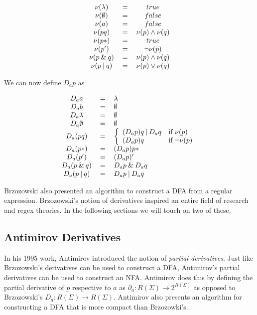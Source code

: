 \[
\begin{tabular}{c c c}
    $\nu(\lambda)$ & $=$ & $true$ \\
    $\nu(\emptyset)$ & $=$ & $false$ \\
    $\nu(a)$ & $=$ & $false$ \\
    $\nu(pq)$ & $=$ & $\nu(p) \land \nu(q)$ \\
    $\nu(p*)$ & $=$ & $true$ \\
    $\nu(p')$ & $=$ & $\neg \nu(p)$ \\
    $\nu(p\:\&\:q)$ & $=$ & $\nu(p) \land \nu(q)$ \\
    $\nu(p\:|\:q)$ & $=$ & $\nu(p) \lor \nu(q)$ \\
\end{tabular}
\]

We can now define $D_ap$ as

\[
\begin{tabular}{c c l}
    $D_aa$ & $=$ & $\lambda$ \\
    $D_ab$ & $=$ & $\emptyset$ \\
    $D_a\lambda$ & $=$ & $\emptyset$ \\
    $D_a\emptyset$ & $=$ & $\emptyset$ \\

    $D_a(pq)$ & $=$ & $
    \left\{
	\begin{array}{ll}
		(D_ap)q\:|\:D_aq  & \mbox{if } \nu(p) \\
		(D_ap)q & \mbox{if } \neg \nu(p)
	\end{array}
    \right.
    $ \\
    
    $D_a(p*)$ & $=$ & $(D_ap)p*$ \\
    $D_a(p')$ & $=$ & $(D_ap)'$ \\
    $D_a(p\:\&\:q)$ & $=$ & $D_ap\:\&\:D_aq$ \\
    $D_a(p\:|\:q)$ & $=$ & $D_ap\:|\:D_aq$ \\
\end{tabular}
\]

Brzozowski also presented an algorithm to construct a DFA from a regular expression.
Brzozowski's notion of derivatives inspired an entire field of research and regex theories. In the following sections we will touch on two of these.

\subsection{Antimirov Derivatives}
In his 1995 work, Antimirov \cite{antimirov} introduced the notion of \textit{partial derivatives}. Just like Brzozowski's derivatives can be used to construct a DFA, Antimirov's partial derivatives can be used to construct an NFA. Antimirov does this by defining the partial derivative of $p$ respective to $a$ as $\partial_a : R(\Sigma) \rightarrow 2^{R(\Sigma)}$ as opposed to Brzozowski's $D_a : R(\Sigma) \rightarrow R(\Sigma)$. Antimirov also presents an algorithm for constructing a DFA that is more compact than Brzozowki's. 

